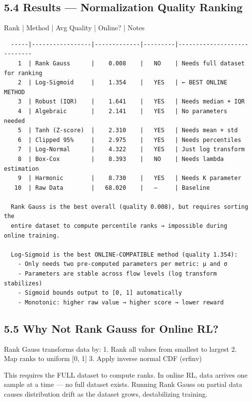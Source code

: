 \documentclass[11pt,a4paper]{article}
\begin{document}
\subsection*{5.4 Results — Normalization Quality Ranking}
Rank | Method          | Avg Quality | Online? | Notes
\vspace{1em}\begin{verbatim}
  -----|-----------------|-------------|---------|----------------------------
    1  | Rank Gauss      |    0.008    |   NO    | Needs full dataset for ranking
    2  | Log-Sigmoid     |    1.354    |   YES   | ← BEST ONLINE METHOD
    3  | Robust (IQR)    |    1.641    |   YES   | Needs median + IQR
    4  | Algebraic       |    2.141    |   YES   | No parameters needed
    5  | Tanh (Z-score)  |    2.310    |   YES   | Needs mean + std
    6  | Clipped 95%     |    2.975    |   YES   | Needs percentiles
    7  | Log-Normal      |    4.322    |   YES   | Just log transform
    8  | Box-Cox         |    8.393    |   NO    | Needs lambda estimation
    9  | Harmonic        |    8.730    |   YES   | Needs K parameter
   10  | Raw Data        |   68.020    |   —     | Baseline

  Rank Gauss is the best overall (quality 0.008), but requires sorting the
  entire dataset to compute percentile ranks → impossible during online training.

  Log-Sigmoid is the best ONLINE-COMPATIBLE method (quality 1.354):
    - Only needs two pre-computed parameters per metric: μ and σ
    - Parameters are stable across flow levels (log transform stabilizes)
    - Sigmoid bounds output to [0, 1] automatically
    - Monotonic: higher raw value → higher score → lower reward

\end{verbatim}
\subsection*{5.5 Why Not Rank Gauss for Online RL?}
Rank Gauss transforms data by:
1. Rank all values from smallest to largest
2. Map ranks to uniform [0, 1]
3. Apply inverse normal CDF (erfinv)

This requires the FULL dataset to compute ranks.
In online RL, data arrives one sample at a time — no full dataset exists.
Running Rank Gauss on partial data causes distribution drift as the
dataset grows, destabilizing training.
\end{document}
